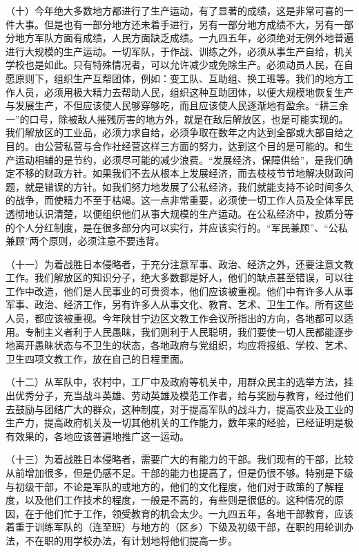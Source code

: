 （十）今年绝大多数地方都进行了生产运动，有了显著的成绩，这是非常可喜的一件大事。但是也有一部分地方还未着手进行，另有一部分地方成绩不大，另有一部分地方军队方面有成绩，人民方面缺乏成绩。一九四五年，必须绝对无例外地普遍进行大规模的生产运动。一切军队，于作战、训练之外，必须从事生产自给，机关学校也是如此。只有特殊情况者，可以允许减少或免除生产。必须动员人民，在自愿原则下，组织生产互帮团体，例如：变工队、互助组、换工班等。我们的地方工作人员，必须用极大精力去帮助人民，组织这种互助团体，以便大规模地恢复生产与发展生产，不但应该使人民够穿够吃，而且应该使人民逐渐地有盈余。“耕三余一”的口号，除被敌人摧残厉害的地方外，就是在敌后解放区，也是可能实现的。我们解放区的工业品，必须力求自给，必须争取在数年之内达到全部或大部自给之目的。由公营私营与合作社经营这样三方面的努力，达到这个目的是可能的。和生产运动相辅的是节约，必须尽可能的减少浪费。“发展经济，保障供给”，是我们确定不移的财政方针。如果我们不去从根本上发展经济，而去枝枝节节地解决财政问题，就是错误的方针。如我们努力地发展了公私经济，我们就能支持不论时间多久的战争，而使精力不至于枯竭。这一点非常重要，必须使一切工作人员及全体军民透彻地认识清楚，以便组织他们从事大规模的生产运动。在公私经济中，按质分等的个人分红制度，是在很多部分内可以实行，并应该实行的。“军民兼顾”、“公私兼顾”两个原则，必须注意不要违背。

（十一）为着战胜日本侵略者，于充分注意军事、政治、经济之外，还要注意文教工作。我们解放区的知识分子，绝大多数都是好人，他们的缺点甚至错误，可以往工作中改造，他们是人民事业的可贵资本，他们应该被重视。他们中有许多人从事军事、政治、经济工作，另有许多人从事文化、教育、艺术、卫生工作。所有这些人员，都应该被重视。今年陕甘宁边区文教工作会议所指出的方向，各地都可以适用。专制主义者利于人民愚昧，我们则利于人民聪明，我们要使一切人民都能逐步地离开愚昧状态与不卫生的状态，各地政府与党组织，均应将报纸、学校、艺术、卫生四项文教工作，放在自己的日程里面。

（十二）从军队中，农村中，工厂中及政府等机关中，用群众民主的选举方法，挂出优秀分子，充当战斗英雄、劳动英雄及模范工作者，给与奖励与教育，经过他们去鼓励与团结广大的群众，这种制度，对于提高军队的战斗力，提高农业及工业的生产力，提高政府机关及一切其他机关的工作能力，数年来的经验，已经证明是极有效果的，各地应该普遍地推广这一运动。

（十三）为着战胜日本侵略者，需要广大的有能力的干部。我们现有的干部，比较从前增加很多，但是仍感不足。干部的能力也提高了，但是仍很不够。特别是下级与初级干部，不论是军队的或地方的，他们的文化程度，他们对于政策的了解程度，以及他们工作技术的程度，一般是不高的，有些则是很低的。这种情况的原因，在于他们忙于工作，领受教育的机会太少。一九四五年，各地干部教育，应该着重于训练军队的（连至班）与地方的（区乡）下级及初级干部，在职的用轮训办法，不在职的用学校办法，有计划地将他们提高一步。

